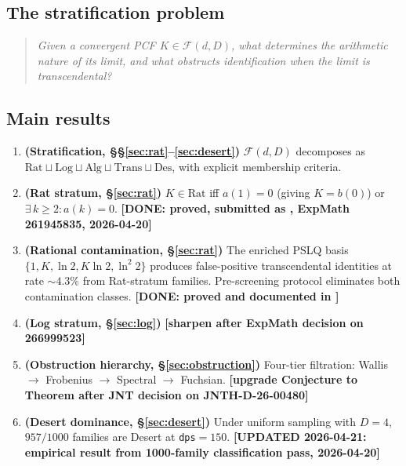 \documentclass[12pt]{amsart}
\newcommand{\PLACEHOLDER}[1]{{\color{red}\textbf{[#1]}}}
\newcommand{\DONE}[1]{{\color{blue}\textbf{[DONE: #1]}}}
\newcommand{\UPDATED}[1]{{\color{teal}\textbf{[UPDATED 2026-04-21: #1]}}}
\begin{document}
\subsection{The stratification problem}

\begin{quote}
\textit{Given a convergent PCF
$K \in \mathcal{F}(d,D)$, what determines the
arithmetic nature of its limit, and what obstructs
identification when the limit is transcendental?}
\end{quote}

\subsection{Main results}

\begin{enumerate}
\item \textbf{(Stratification,
  \S\S\ref{sec:rat}--\ref{sec:desert})}
  $\mathcal{F}(d,D)$ decomposes as
  $\mathrm{Rat} \sqcup \mathrm{Log} \sqcup
  \mathrm{Alg} \sqcup \mathrm{Trans} \sqcup
  \mathrm{Des}$,
  with explicit membership criteria.

\item \textbf{(Rat stratum, \S\ref{sec:rat})}
  $K \in \mathrm{Rat}$ iff $a(1)=0$ (giving $K=b(0)$)
  or $\exists\,k\geq 2: a(k)=0$.
  \DONE{proved, submitted as \cite{Rat},
  ExpMath 261945835, 2026-04-20}

\item \textbf{(Rational contamination,
  \S\ref{sec:rat})}
  The enriched PSLQ basis
  $\{1,K,\ln 2, K\ln 2,\ln^2 2\}$ produces
  false-positive transcendental identities at
  rate $\sim\!4.3\%$ from Rat-stratum families.
  Pre-screening protocol eliminates both
  contamination classes.
  \DONE{proved and documented in \cite{Rat}}

\item \textbf{(Log stratum, \S\ref{sec:log})}
  \PLACEHOLDER{sharpen after ExpMath decision
  on 266999523}

\item \textbf{(Obstruction hierarchy,
  \S\ref{sec:obstruction})}
  Four-tier filtration: Wallis $\to$ Frobenius
  $\to$ Spectral $\to$ Fuchsian.
  \PLACEHOLDER{upgrade Conjecture to Theorem
  after JNT decision on JNTH-D-26-00480}

\item \textbf{(Desert dominance,
  \S\ref{sec:desert})}
  Under uniform sampling with $D=4$,
  $957/1000$ families are Desert at
  \texttt{dps}$=150$.
  \UPDATED{empirical result from
  1000-family classification pass,
  2026-04-20}


\end{enumerate}
\end{document}
